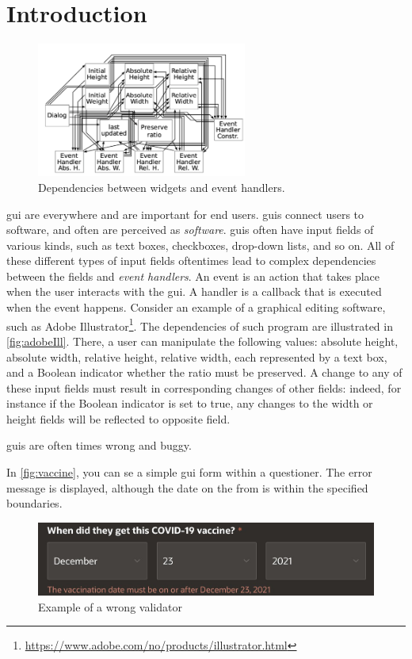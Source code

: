 \chapter{Introduction}

\begin{figure}
    \includegraphics[width=6.9cm, frame]{figures/adobeIll.png}
    \caption{Dependencies between widgets and event handlers.}
    \label{fig:adobeIll}
\end{figure}

\gls{gui} are everywhere and are important for end users. \gls{gui}s connect users to software, and often are perceived as \emph{software}. \gls{gui}s often have input fields of various kinds, such as text boxes, checkboxes, drop-down lists, and so on. All of these different types of input fields oftentimes lead to complex dependencies between the fields and \textit{event handlers}. An event is an action that takes place when the user interacts with the \gls{gui}. A handler is a callback that is executed when the event happens. Consider an example of a graphical editing software, such as Adobe Illustrator\footnote{\url{https://www.adobe.com/no/products/illustrator.html}}. The dependencies of such program are illustrated in \autoref{fig:adobeIll}. There, a user can manipulate the following values: absolute height, absolute width, relative height, relative width, each represented by a text box, and a Boolean indicator whether the ratio must be preserved. A change to any of these input fields must result in corresponding changes of other fields: indeed, for instance if the Boolean indicator is set to true, any changes to the width or height fields will be reflected to opposite field. 


\gls{gui}s are often times wrong and buggy. 

In \autoref{fig:vaccine}, you can se a simple \gls{gui} form within a questioner. The error message is displayed, although the date on the from is within the specified boundaries.

\begin{figure}
    \centering
    \includegraphics[scale=0.35]{figures/vaccine.jpeg}
    \caption{Example of a wrong validator}
    \label{fig:vaccine}
\end{figure}

